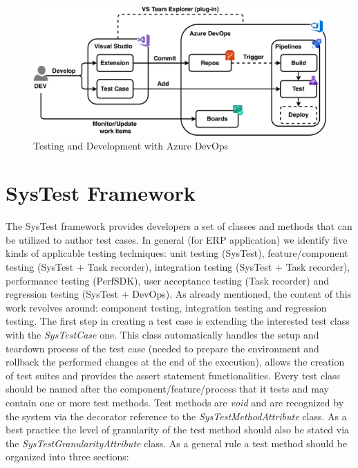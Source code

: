 \begin{figure}[ht]
	\centering
	\includegraphics[scale=0.55]{Images/DevOpsTesting.pdf}
	\caption{Testing and Development with Azure DevOps}
	\label{fig:devOpsTesting}
\end{figure}

\section{SysTest Framework} 

The SysTest framework provides developers a set of classes and methods that can be utilized to author test cases. In general (for ERP application) we identify five kinds of applicable testing techniques: unit testing (SysTest), feature/component testing (SysTest + Task recorder), integration testing (SysTest + Task recorder), performance testing (PerfSDK), user acceptance testing (Task recorder) and regression testing (SysTest + DevOps).  As already mentioned, the content of this work revolves around: component testing, integration testing and regression testing. The first step in creating a test case is extending the interested test class with the \textit{SysTestCase} one. This class automatically handles the setup and teardown process of the test case (needed to prepare the environment and rollback the performed changes at the end of the execution), allows the creation of test suites and provides the assert statement functionalities.   Every test class should be named after the component/feature/process that it tests and may contain one or more test methods. Test methods are \textit{void} and are recognized by the system via the decorator reference to the \textit{SysTestMethodAttribute} class. As a best practice the level of granularity of the test method should also be stated via the \textit{SysTestGranularityAttribute} class. As a general rule a test method should be organized into three sections:

